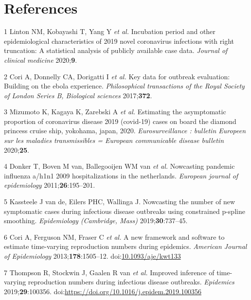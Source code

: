 \documentclass[]{article}
\begin{document}
\hypertarget{references}{%
\section*{References}\label{references}}

\hypertarget{refs}{}
\leavevmode\hypertarget{ref-Linton:2020gg}{}%
1 Linton NM, Kobayashi T, Yang Y \emph{et al.} Incubation period and
other epidemiological characteristics of 2019 novel coronavirus
infections with right truncation: A statistical analysis of publicly
available case data. \emph{Journal of clinical medicine}
2020;\textbf{9}.

\leavevmode\hypertarget{ref-Cori:2017fg}{}%
2 Cori A, Donnelly CA, Dorigatti I \emph{et al.} Key data for outbreak
evaluation: Building on the ebola experience. \emph{Philosophical
transactions of the Royal Society of London Series B, Biological
sciences} 2017;\textbf{372}.

\leavevmode\hypertarget{ref-Mizumoto:2020ct}{}%
3 Mizumoto K, Kagaya K, Zarebski A \emph{et al.} Estimating the
asymptomatic proportion of coronavirus disease 2019 (covid-19) cases on
board the diamond princess cruise ship, yokohama, japan, 2020.
\emph{Eurosurveillance : bulletin Europeen sur les maladies
transmissibles = European communicable disease bulletin}
2020;\textbf{25}.

\leavevmode\hypertarget{ref-Donker:2011fk}{}%
4 Donker T, Boven M van, Ballegooijen WM van \emph{et al.} Nowcasting
pandemic influenza a/h1n1 2009 hospitalizations in the netherlands.
\emph{European journal of epidemiology} 2011;\textbf{26}:195--201.

\leavevmode\hypertarget{ref-vandeKassteele:2019cn}{}%
5 Kassteele J van de, Eilers PHC, Wallinga J. Nowcasting the number of
new symptomatic cases during infectious disease outbreaks using
constrained p-spline smoothing. \emph{Epidemiology (Cambridge, Mass)}
2019;\textbf{30}:737--45.

\leavevmode\hypertarget{ref-cori2013}{}%
6 Cori A, Ferguson NM, Fraser C \emph{et al.} A new framework and
software to estimate time-varying reproduction numbers during epidemics.
\emph{American Journal of Epidemiology} 2013;\textbf{178}:1505--12.
doi:\href{https://doi.org/10.1093/aje/kwt133}{10.1093/aje/kwt133}

\leavevmode\hypertarget{ref-THOMPSON2019100356}{}%
7 Thompson R, Stockwin J, Gaalen R van \emph{et al.} Improved inference
of time-varying reproduction numbers during infectious disease
outbreaks. \emph{Epidemics} 2019;\textbf{29}:100356.
doi:\href{https://doi.org/https://doi.org/10.1016/j.epidem.2019.100356}{https://doi.org/10.1016/j.epidem.2019.100356}
\end{document}
